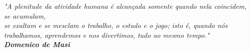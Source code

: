 \begin{epigrafe}[]
    \vspace*{\fill}
	\begin{flushright}
	
		\textit{"A plenitude da atividade humana é alcançada somente quando nela coincidem, se acumulam,\\ se exaltam e se mesclam o trabalho, o estudo e o jogo; isto é,  quando nós \\ trabalhamos, aprendemos e nos divertimos, tudo ao mesmo tempo."\\
				\textbf{Domenico de Masi}}
		
	\end{flushright}
\end{epigrafe}
  


